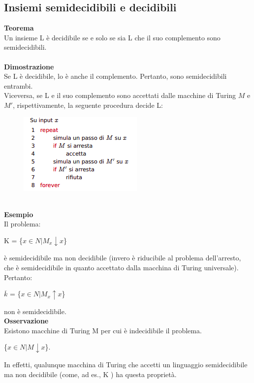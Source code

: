 \subsection{Insiemi semidecidibili e decidibili}
\textbf{Teorema}\\
Un insieme L è decidibile se e solo se sia L che il suo complemento sono semidecidibili.\\\\
\textbf{Dimostrazione}\\
Se L è decidibile, lo è anche il complemento. Pertanto, sono semidecidibili entrambi.\\
Viceversa, se L e il suo complemento sono accettati dalle macchine di Turing $M$ e $M'$, rispettivamente, la seguente procedura decide L:\\
\begin{figure}[htp]
    \includegraphics[scale=0.8]{tesi_stile/img/official.png}
\end{figure}\\
\textbf{Esempio}\\
Il problema:
\begin{center}
    K = \{$x \in N | M_x \downarrow x $\}
\end{center}
è semidecidibile ma non decidibile (invero è riducibile al problema dell’arresto, che è semidecidibile in quanto accettato dalla macchina di Turing universale).\\
Pertanto:\\
\begin{center}
    $\overline{k}$ = \{$x \in N | M_x \uparrow x $\}
\end{center}
non è semidecidibile.\\
\textbf{Osservazione}\\
Esistono macchine di Turing M per cui è indecidibile il problema.
\begin{center}
    \{$x \in N | M \downarrow x$\}.
\end{center}
In effetti, qualunque macchina di Turing che accetti un linguaggio semidecidibile ma non decidibile (come, ad es., K ) ha questa proprietà.
